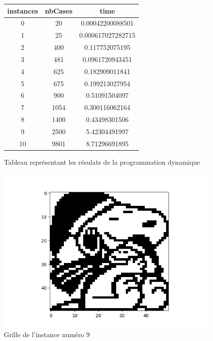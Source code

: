 \documentclass[a4paper]{memoir}
\begin{document}
        
        \begin{figure}
          \begin{center}
            \begin{tabular}{|c||c||c|}
              \hline
              instances & nbCases & time \\ 
              \hline
              0 & 20 & 0.00042200088501 \\ 
              \hline
              1 & 25 & 0.000617027282715 \\ 
              \hline
              2 & 400 & 0.117752075195 \\ 
              \hline
              3 & 481 & 0.0961720943451 \\ 
              \hline
              4 & 625 & 0.182909011841 \\ 
              \hline
              5 & 675 & 0.199213027954 \\ 
              \hline
              6 & 900 & 0.51091504097 \\ 
              \hline
              7 & 1054 & 0.300116062164 \\ 
              \hline
              8 & 1400 & 0.43498301506 \\ 
              \hline
              9 & 2500 & 5.42304491997 \\ 
              \hline
              10 & 9801 & 8.71296691895 \\ 
              \hline
            \end{tabular}
            \caption{Tableau représentant les résulats de la programmation dynamique}
          \end{center}
          \end{figure}


\begin{figure}[h]
  \centering
  \includegraphics[width=0.75\linewidth]{../images/dynamique_instance9.png}
  \caption{Grille de l'instance numéro 9}
  \label{fig:instance9}
\end{figure}
\end{document}
